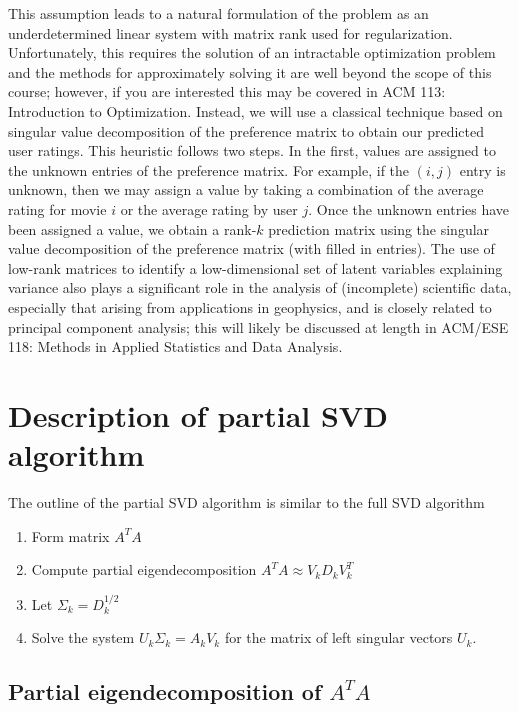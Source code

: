 \documentclass[11pt]{article} %
\begin{document}
This assumption leads to a natural formulation of the problem as an underdetermined linear system with
matrix rank used for regularization. Unfortunately, this requires the solution of an intractable optimization
problem and the methods for approximately solving it are well beyond the scope of this course; however, if
you are interested this may be covered in ACM 113: Introduction to Optimization. Instead, we will use a
classical technique based on singular value decomposition of the preference matrix to obtain our predicted
user ratings. This heuristic follows two steps. In the first, values are assigned to the unknown entries of
the preference matrix. For example, if the $(i, j)$ entry is unknown, then we may assign a value by taking a
combination of the average rating for movie $i$ or the average rating by user $j$. Once the unknown entries
have been assigned a value, we obtain a rank-$k$ prediction matrix using the singular value decomposition of
the preference matrix (with filled in entries). The use of low-rank matrices to identify a low-dimensional set
of latent variables explaining variance also plays a significant role in the analysis of (incomplete) scientific
data, especially that arising from applications in geophysics, and is closely related to principal component
analysis; this will likely be discussed at length in ACM/ESE 118: Methods in Applied Statistics and Data
Analysis.

\section{Description of partial SVD algorithm}

The outline of the partial SVD algorithm is similar to the full SVD algorithm

\begin{enumerate}
\item Form matrix $A^T A$
\item Compute partial eigendecomposition $A^T A \approx V_k D_k V_k^T$
\item Let $\Sigma_k = D_k^{1/2}$
\item Solve the system $U_k \Sigma_k  = A_k V_k$ for the matrix of left singular vectors $U_k$.
\end{enumerate}

\subsection{Partial eigendecomposition of $A^T A$}
\end{document}

